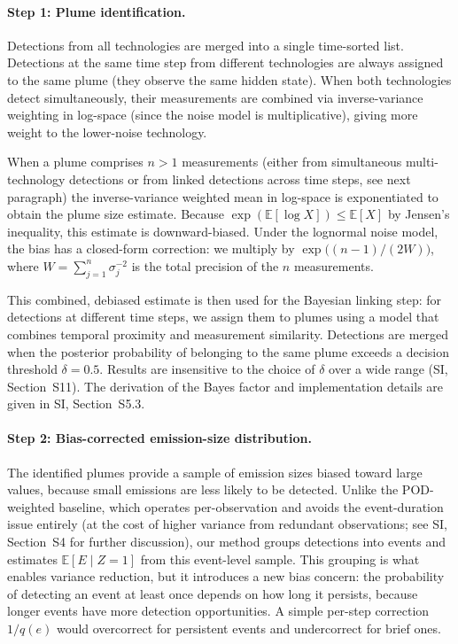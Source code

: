 \documentclass[unnumsec,webpdf,modern,mediumone]{oup-authoring-template}
\begin{document}
\paragraph{Step 1: Plume identification.}
Detections from all technologies are merged into a single time-sorted list. Detections at the same time step from different technologies are always assigned to the same plume (they observe the same hidden state). When both technologies detect simultaneously, their measurements are combined via inverse-variance weighting in log-space (since the noise model is multiplicative), giving more weight to the lower-noise technology.

When a plume comprises $n > 1$ measurements (either from simultaneous multi-technology detections or from linked detections across time steps, see next paragraph) the inverse-variance weighted mean in log-space is exponentiated to obtain the plume size estimate. Because $\exp(\mathbb{E}[\log X]) \leq \mathbb{E}[X]$ by Jensen's inequality, this estimate is downward-biased. Under the lognormal noise model, the bias has a closed-form correction: we multiply by $\exp\bigl((n-1)/(2W)\bigr)$, where $W = \sum_{j=1}^{n} \sigma_j^{-2}$ is the total precision of the $n$ measurements.

This combined, debiased estimate is then used for the Bayesian linking step: for detections at different time steps, we assign them to plumes using a model that combines temporal proximity and measurement similarity. Detections are merged when the posterior probability of belonging to the same plume exceeds a decision threshold $\delta = 0.5$. Results are insensitive to the choice of $\delta$ over a wide range (SI, Section~S11). The derivation of the Bayes factor and implementation details are given in SI, Section~S5.3.

\paragraph{Step 2: Bias-corrected emission-size distribution.}
The identified plumes provide a sample of emission sizes biased toward large values, because small emissions are less likely to be detected. Unlike the POD-weighted baseline, which operates per-observation and avoids the event-duration issue entirely (at the cost of higher variance from redundant observations; see SI, Section~S4 for further discussion), our method groups detections into events and estimates $\mathbb{E}[E \mid Z=1]$ from this event-level sample. This grouping is what enables variance reduction, but it introduces a new bias concern: the probability of detecting an event at least once depends on how long it persists, because longer events have more detection opportunities. A simple per-step correction $1/q(e)$ would overcorrect for persistent events and undercorrect for brief ones.
\end{document}
